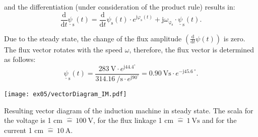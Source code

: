 \begin{solutionblock}
    and the differentiation (under consideration of the product rule) results in:
    \begin{equation}
        \frac{\mathrm{d}}{\mathrm{d}t}\underline{\psi}_{\mathrm{s}}(t)
        = \frac{\mathrm{d}}{\mathrm{d}t} \psi_{\mathrm{s}}(t) \cdot e^{\mathrm{j}\varphi_{\mathrm{s}}(t)} + \mathrm{j} \omega_{\mathrm{\varphi_s}} \cdot \underline{\psi}_{\mathrm{s}}(t).
    \end{equation}

    Due to the steady state, the change of the flux amplitude $\left(\frac{\mathrm{d}}{\mathrm{d}t}\psi(t)\right)$ is zero. The flux vector rotates with the speed $\omega$, therefore, the flux vector is determined as follows:
    \begin{equation}
        \underline{\psi}_{\mathrm{s}}(t)
        = \frac{\SI{283}{\volt} \cdot e^{\mathrm{j}44.4^{\circ}}}{\SI{314.16}{\per\second}\cdot e^{\mathrm{j}90^{\circ}}}
        = \SI{0.90}{\volt\second} \cdot e^{-\mathrm{j}\SI{45.6}{\degree}}.
    \end{equation}


    \begin{solutionfigure}
        \centering
        \texttt{[image: ex05/vectorDiagram\_IM.pdf]}
        \caption{Resulting vector diagram of the induction machine in steady state. The scala for the voltage is 1 cm $\widehat{=}~\SI{100}{\volt} $, for the flux linkage 1 cm $\widehat{=}~\SI{1}{\volt\second}$ and for the current 1 cm $\widehat{=}~\SI{10}{\ampere}$.}
        \label{fig:vectorDiagram_IM}
    \end{solutionfigure}


\end{solutionblock}